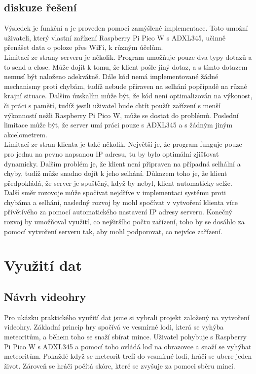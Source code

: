 \documentclass[12pt]{report}			%
\begin{document}
\subsection{diskuze řešení}
Výsledek je funkční a je proveden pomocí zamýšlené implementace. Toto umožní uživateli, který vlastní zařízení Raspberry Pi Pico W s ADXL345, učinně přenášet data o poloze přes WiFi, k různým účelům. 
\\
Limitací ze strany serveru je několik. Program umožňuje pouze dva typy dotazů a to send a close. Může dojít k tomu, že klient pošle jiný dotaz, a s tímto dotazem nemusí být naloženo adekvátně. Dále kód nemá implementované žádné mechanismy proti chybám, tudíž nebude přiraven na selhání popřípadě na různé krajní situace. Dalším úzskalím může být, že kód není optimalizován na výkonost, či práci s pamětí, tudíž jestli uživatel bude chtít použít zařízení s menší výkonností nežli Raspberry Pi Pico W, může se dostat do problémů. Poslední limitace může být, že server umí práci pouze s ADXL345 a s žádným jiným akcelometrem.
\\
Limitací ze stran klienta je také několik. Největší je, že program funguje pouze pro jednu na pevno napsanou IP adresu, tu by bylo optimální zjišťovat dynamicky. Dalším problém je, že klient není připraven na případná selhální a chyby, tudíž může snadno dojít k jeho selhání. Důkazem toho je, že klient předpokládá, že server je spuštěný, když by nebyl, klient automaticky selže. 
\\
Další směr rozovoje může spočívat nejdříve v implementaci systému proti chybáma a selhání, nasledný rozvoj by mohl spočívat v vytvoření klienta více přívětívého za pomocí automatického nastavení IP adresy serveru. Konečný rozvoj by umožňoval využití, co nejširšího počtu zařízení, toho by se dosáhlo za pomocí vytvoření serveru tak, aby mohl podporovat, co nejvíce zařízení. 

\section{Využití dat}
\subsection{Návrh videohry}
Pro ukázku praktického využití dat jsme si vybrali projekt založený na vytvoření videohry. Základní princip hry spočívá ve vesmírné lodi, která se vyhýba meteoritům, a během toho se snaží sbírat mince. Uživatel pohybuje s Raspberry Pi Pico W s ADXL345 a pomocí toho ovládá loď na obrazovce a snaží se vyhýbat meteoritům. Pokaždé když se meteorit trefí do vesmírné lodi, hráči se ubere jeden život. Zároveň se hráči počítá skóre, které se zvyšuje za pomoci sběru mincí. 
\end{document}

